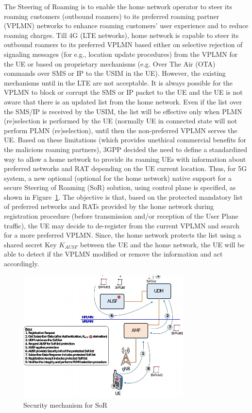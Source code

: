 \begin{multicols}{2}
The Steering of Roaming is to enable the home network operator to steer its roaming customers (outbound roamers) to its preferred roaming partner (VPLMN) networks to enhance roaming customers’ user experience and to reduce roaming charges. Till 4G (LTE networks), home network is capable to steer its outbound roamers to its preferred VPLMN based either on selective rejection of signaling messages (for e.g., location update procedures) from the VPLMN for the UE or based on proprietary mechanisms (e.g. Over The Air (OTA) commands over SMS or IP to the USIM in the UE). However, the existing mechanisms until in the LTE are not acceptable. It is always possible for the VPLMN to block or corrupt the SMS or IP packet to the UE and the UE is not aware that there is an updated list from the home network. Even if the list over the SMS/IP is received by the USIM, the list will be effective only when PLMN (re)selection is performed by the UE (normally UE in connected state will not perform PLMN (re)selection), until then the non-preferred VPLMN serves the UE. Based on these limitations (which provides unethical commercial benefits for the malicious roaming partners), 3GPP decided the need to define a standardized way to allow a home network to provide its roaming UEs with information about preferred networks and RAT depending on the UE current location. Thus, for 5G system, a new optional (optional for the home network) native support for a secure Steering of Roaming (SoR) solution, using control plane is specified, as shown in Figure~\ref{chap4-fig04}. The objective is that, based on the protected mandatory list of preferred networks and RATs provided by the home network during registration procedure (before transmission and/or reception of the User Plane traffic), the UE may decide to de-register from the current VPLMN and search for a more preferred VPLMN. Since, the home network protects the list using a shared secret Key $K_{AUSF}$ between the UE and the home network, the UE will be able to detect if the VPLMN modified or remove the information and act accordingly.
\begin{figure}[H]
\centering
\includegraphics[scale=0.75]{src/Figures/chap4/chap4-fig04.jpg}
\caption{Security mechanism for SoR}\label{chap4-fig04}
\end{figure}


\end{multicols}
